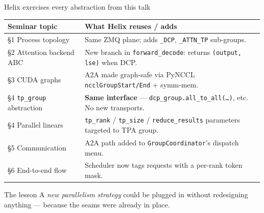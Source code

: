 \documentclass[aspectratio=169,10pt]{beamer}
\begin{document}
\begin{frame}{Helix exercises every abstraction from this talk}
  \footnotesize
  \begin{tabular}{l p{7.8cm}}
    \toprule
    \textbf{Seminar topic} & \textbf{What Helix reuses / adds} \\
    \midrule
    \S1 Process topology           & Same ZMQ plane; adds \texttt{\_DCP}, \texttt{\_ATTN\_TP} sub-groups. \\
    \S2 Attention backend ABC      & New branch in \texttt{forward\_decode}: returns \texttt{(output, lse)} when DCP. \\
    \S3 CUDA graphs                & A2A made graph-safe via PyNCCL \texttt{ncclGroupStart/End} + symm-mem. \\
    \S4 \texttt{tp\_group} abstraction  & \textbf{Same interface} --- \texttt{dcp\_group.all\_to\_all(\dots)}, etc. No new transports. \\
    \S4 Parallel linears           & \texttt{tp\_rank} / \texttt{tp\_size} / \texttt{reduce\_results} parameters targeted to TPA group. \\
    \S5 Communication              & A2A path added to \texttt{GroupCoordinator}'s dispatch menu. \\
    \S6 End-to-end flow            & Scheduler now tags requests with a per-rank token mask. \\
    \bottomrule
  \end{tabular}
  \vspace{0.4cm}
  \begin{block}{The lesson}\small
    A \emph{new parallelism strategy} could be plugged in without redesigning anything --- because the seams were already in place.
  \end{block}
\end{frame}
\end{document}
